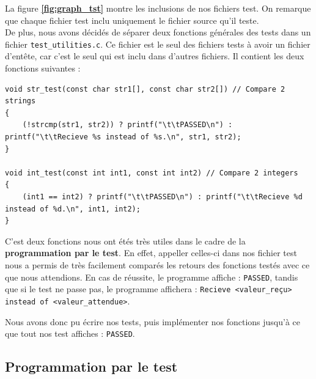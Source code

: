         La figure \textbf{\ref{fig:graph_tst}} montre les inclusions de nos fichiers test. On remarque que chaque fichier test inclu uniquement le fichier source qu'il teste. \\
        
        De plus, nous avons décidés de séparer deux fonctions générales des tests dans un fichier \texttt{test\_utilities.c}. Ce fichier est le seul des fichiers tests à avoir un fichier d'entête, car c'est le seul qui est inclu dans d'autres fichiers. Il contient les deux fonctions suivantes :

        \begin{Code}
            \begin{lstlisting}
void str_test(const char str1[], const char str2[]) // Compare 2 strings
{ 
    (!strcmp(str1, str2)) ? printf("\t\tPASSED\n") : printf("\t\tRecieve %s instead of %s.\n", str1, str2);
}

void int_test(const int int1, const int int2) // Compare 2 integers
{
    (int1 == int2) ? printf("\t\tPASSED\n") : printf("\t\tRecieve %d instead of %d.\n", int1, int2);
}\end{lstlisting}
        \end{Code}

        C'est deux fonctions nous ont étés très utiles dans le cadre de la \textbf{programmation par le test}. En effet, appeller celles-ci dans nos fichier test nous a permis de très facilement comparés les retours des fonctions testés avec ce que nous attendions. En cas de réussite, le programme affiche : \texttt{PASSED}, tandis que si le test ne passe pas, le programme affichera : \texttt{Recieve <valeur\_reçu> instead of <valeur\_attendue>}.

        Nous avons donc pu écrire nos tests, puis implémenter nos fonctions jusqu'à ce que tout nos test affiches : \texttt{PASSED}.
        
    \subsection{Programmation par le test}
